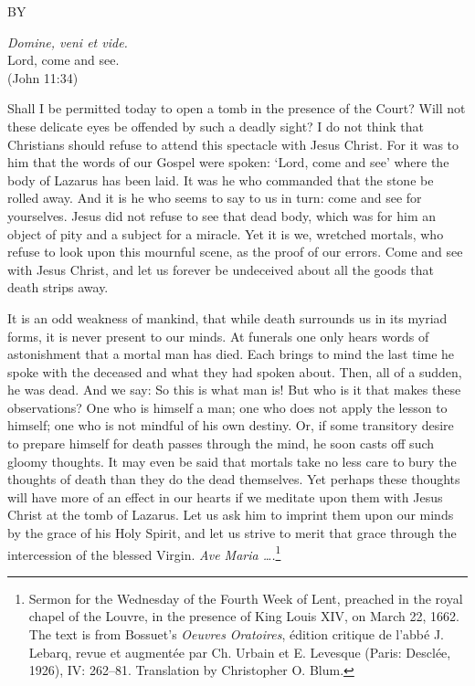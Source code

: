 \documentclass[10pt, twoside]{article}
\title{\essaytitle}
\author{\essayauthor}
\makeatletter
\let\thetitle\@title
\let\theauthor\@author
\renewcommand{\maketitle}{
  \begin{center}
    {\fontseries{bx}\normalsize\MakeUppercase\thetitle \par}
    {\footnotesize\MakeUppercase{by \theauthor}}
  \end{center}
}
\makeatother
\begin{document}
\maketitle
\vspace{1.5em}
\begin{center}
  \small\textit{Domine, veni et vide.}\\
  Lord, come and see.\\
  (John 11:34)
\end{center}
\vspace{1.5em}
\small
Shall I be permitted today to open a tomb in the presence of the Court? Will not these delicate eyes be offended by such a deadly sight? I do not think that Christians should refuse to attend this spectacle with Jesus Christ. For it was to him that the words of our Gospel were spoken: `Lord, come and see' where the body of Lazarus has been laid. It was he who commanded that the stone be rolled away. And it is he who seems to say to us in turn: come and see for yourselves. Jesus did not refuse to see that dead body, which was for him an object of pity and a subject for a miracle. Yet it is we, wretched mortals, who refuse to look upon this mournful scene, as the proof of our errors. Come and see with Jesus Christ, and let us forever be undeceived about all the goods that death strips away.

It is an odd weakness of mankind, that while death surrounds us in its myriad forms, it is never present to our minds. At funerals one only hears words of astonishment that a mortal man has died. Each brings to mind the last time he spoke with the deceased and what they had spoken about. Then, all of a sudden, he was dead. And we say: So this is what man is! But who is it that makes these observations? One who is himself a man; one who does not apply the lesson to himself; one who is not mindful of his own destiny. Or, if some transitory desire to prepare himself for death passes through the mind, he soon casts off such gloomy thoughts. It may even be said that mortals take no less care to bury the thoughts of death than they do the dead themselves. Yet perhaps these thoughts will have more of an effect in our hearts if we meditate upon them with Jesus Christ at the tomb of Lazarus. Let us ask him to imprint them upon our minds by the grace of his Holy Spirit, and let us strive to merit that grace through the intercession of the blessed Virgin. \textit{Ave Maria \ldots .}\footnote{Sermon for the Wednesday of the Fourth Week of Lent, preached in the royal chapel of the Louvre, in the presence of King Louis XIV, on March 22, 1662. The text is from Bossuet's \textit{Oeuvres Oratoires}, édition critique de l'abbé J. Lebarq, revue et augmentée par Ch. Urbain et E. Levesque (Paris: Desclée, 1926), IV: 262--81. Translation by Christopher O. Blum.}
\end{document}
